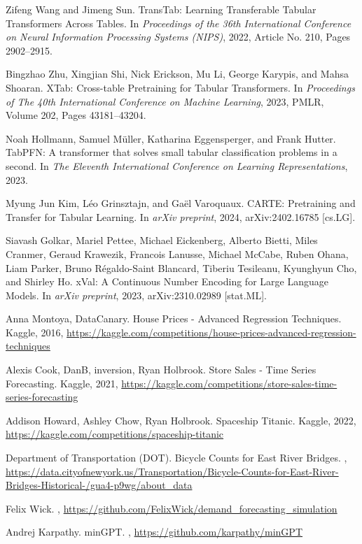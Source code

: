 \documentclass{article}
\begin{document}
\begin{thebibliography}{1}
Zifeng Wang and Jimeng Sun.
\newblock TransTab: Learning Transferable Tabular Transformers Across Tables.
\newblock In {\em Proceedings of the 36th International Conference on Neural Information Processing Systems (NIPS)}, 2022, Article No. 210, Pages 2902--2915.

Bingzhao Zhu, Xingjian Shi, Nick Erickson, Mu Li, George Karypis, and Mahsa Shoaran.
\newblock XTab: Cross-table Pretraining for Tabular Transformers.
\newblock In {\em Proceedings of The 40th International Conference on Machine Learning}, 2023, PMLR, Volume 202, Pages 43181--43204.

Noah Hollmann, Samuel Müller, Katharina Eggensperger, and Frank Hutter.
\newblock TabPFN: A transformer that solves small tabular classification problems in a second.
\newblock In {\em The Eleventh International Conference on Learning Representations}, 2023.

Myung Jun Kim, Léo Grinsztajn, and Gaël Varoquaux.
\newblock CARTE: Pretraining and Transfer for Tabular Learning.
\newblock In {\em arXiv preprint}, 2024, arXiv:2402.16785 [cs.LG].

Siavash Golkar, Mariel Pettee, Michael Eickenberg, Alberto Bietti, Miles Cranmer, Geraud Krawezik, Francois Lanusse, Michael McCabe, Ruben Ohana, Liam Parker, Bruno Régaldo-Saint Blancard, Tiberiu Tesileanu, Kyunghyun Cho, and Shirley Ho.
\newblock xVal: A Continuous Number Encoding for Large Language Models.
\newblock In {\em arXiv preprint}, 2023, arXiv:2310.02989 [stat.ML].

Anna Montoya, DataCanary.
\newblock House Prices - Advanced Regression Techniques.
\newblock Kaggle, 2016, \url{https://kaggle.com/competitions/house-prices-advanced-regression-techniques}

Alexis Cook, DanB, inversion, Ryan Holbrook.
\newblock Store Sales - Time Series Forecasting.
\newblock Kaggle, 2021, \url{https://kaggle.com/competitions/store-sales-time-series-forecasting}

Addison Howard, Ashley Chow, Ryan Holbrook.
\newblock Spaceship Titanic.
\newblock Kaggle, 2022, \url{https://kaggle.com/competitions/spaceship-titanic}

Department of Transportation (DOT).
\newblock Bicycle Counts for East River Bridges.
, \url{https://data.cityofnewyork.us/Transportation/Bicycle-Counts-for-East-River-Bridges-Historical-/gua4-p9wg/about_data}

Felix Wick.
, \url{https://github.com/FelixWick/demand_forecasting_simulation}

Andrej Karpathy.
\newblock minGPT.
, \url{https://github.com/karpathy/minGPT}

\end{thebibliography}
\end{document}
